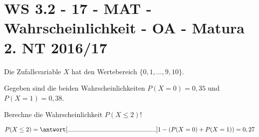 \section{WS 3.2 - 17 - MAT - Wahrscheinlichkeit - OA - Matura 2. NT 2016/17}

\begin{beispiel}[WS 3.2]{1} %
Die Zufallsvariable $X$ hat den Wertebereich $\{0, 1, \ldots, 9, 10\}$.

Gegeben sind die beiden Wahrscheinlichkeiten $P(X=0)=0,35$ und\\ 
\mbox{$P(X=1)=0,38$}.\leer

Berechne die Wahrscheinlichkeit $P(X\leq 2)$!\leer

$P(X\leq 2)=\antwort[\rule{5cm}{0.3pt}]{1-(P(X=0)+P(X=1))=0,27}$
\end{beispiel}